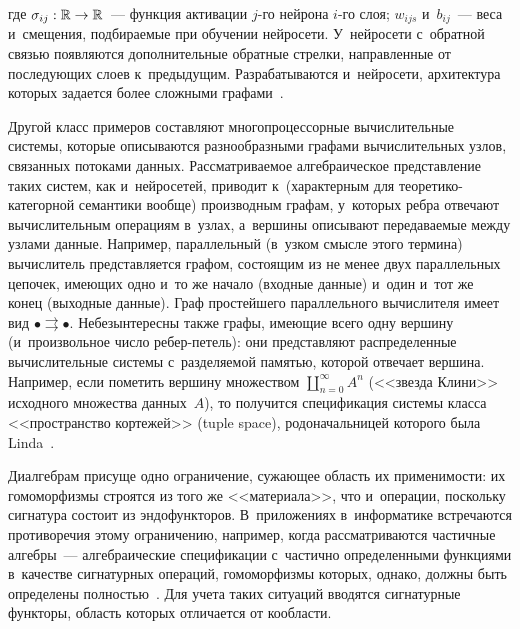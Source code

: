 \begin{multicols}{2}
\noindent
где $\sigma_{ij} : \mathbb{R}\hm\to \mathbb{R}$~--- функ\-ция активации $j$-го 
нейрона $i$-го слоя; $w_{ijs}$ и~$b_{ij}$~--- веса и~смещения, под\-би\-ра\-емые при 
обуче\-нии ней\-ро\-се\-ти. У~нейросети с~об\-рат\-ной связью появляются 
дополнительные обрат\-ные стрел\-ки, на\-прав\-лен\-ные от по\-сле\-ду\-ющих слоев 
к~предыду\-щим. Разрабатываются и~нейросети, архитектура которых задается 
более слож\-ны\-ми графами~\cite{10-kov}.

  Другой класс примеров со\-став\-ля\-ют многопроцессорные вы\-чис\-ли\-тель\-ные 
сис\-те\-мы, которые описываются разнообразными графами вы\-чис\-ли\-тель\-ных 
узлов, связанных потоками данных. \mbox{Рас\-смат\-ри\-ва\-емое} алгебраическое 
пред\-став\-ле\-ние таких сис\-тем, как и~нейросетей, приводит к~(характерным для  
тео\-ре\-ти\-ко-ка\-те\-гор\-ной семантики вообще) производным графам, 
у~которых ребра отвечают вы\-чис\-ли\-тель\-ным операциям в~узлах, а~вершины 
описывают пе\-ре\-да\-ва\-емые меж\-ду узлами данные. Например, параллельный 
(в~уз\-ком смыс\-ле этого термина) вы\-чис\-ли\-тель пред\-став\-ля\-ет\-ся графом, 
со\-сто\-ящим из не менее двух параллельных цепочек, име\-ющих одно и~то же 
начало (входные данные) и~один и~тот же конец (выходные данные). Граф 
прос\-тей\-ше\-го параллельного вы\-чис\-ли\-те\-ля имеет вид $\bullet \rightrightarrows 
\bullet$. Небезынтересны также графы, имеющие всего одну вершину 
(и~произвольное чис\-ло ре\-бер-пе\-тель): они представляют распределенные 
вы\-чис\-ли\-тель\-ные сис\-те\-мы с~раз\-де\-ля\-емой памятью, которой отвечает вершина. 
Например, если пометить вершину множеством $\coprod_{n=0}^\infty A^n$ 
(<<звезда Клини>> исходного множества данных~$A$), то получится 
спецификация сис\-те\-мы класса <<пространство кортежей>> (tuple space), 
родоначальницей которого была Linda~\cite{11-kov}.
  
  Диалгебрам присуще одно ограничение, сужа\-ющее область их 
применимости: их гомоморфизмы стро\-ят\-ся из того же <<материала>>, что 
и~операции, поскольку сигнатура со\-сто\-ит из эндофункторов. В~приложениях 
в~информатике встречаются противоречия этому ограничению, например, 
когда рас\-смат\-ри\-ва\-ют\-ся час\-тич\-ные алгебры~--- алгебраические спецификации 
с~час\-тич\-но определенными функциями в~качестве сигнатурных операций, 
гомоморфизмы которых, однако, долж\-ны быть определены  
пол\-ностью~\cite{12-kov}. Для учета таких ситуаций вводятся сигнатурные 
функторы, об\-ласть которых отличается от ко\-об\-ласти.

  

\end{multicols}
